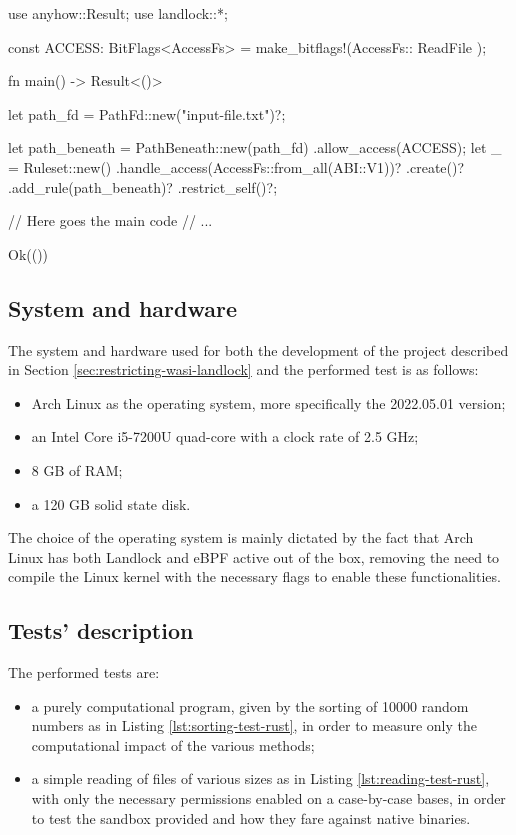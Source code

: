\vspace*{0.7cm}
\begin{code}[language=Rust, caption=An example of a program restricted with Landlock., label=lst:test-program-landlock-example]
use anyhow::Result;
use landlock::*;

const ACCESS: BitFlags<AccessFs> =
  make_bitflags!(AccessFs::{ ReadFile });

fn main() -> Result<()> {
    let path_fd = PathFd::new("input-file.txt")?;
    
    let path_beneath = PathBeneath::new(path_fd)
      .allow_access(ACCESS);
    let _ = Ruleset::new()
        .handle_access(AccessFs::from_all(ABI::V1))?
        .create()?
        .add_rule(path_beneath)?
        .restrict_self()?;

    // Here goes the main code
    // ...

    Ok(())
}
\end{code}

\clearpage
\subsection{System and hardware}

The system and hardware used for both the development of the project described in Section \ref{sec:restricting-wasi-landlock}
and the performed test is as follows:
\begin{itemize}
  \item Arch Linux \cite{arch-linux} as the operating system, more specifically the 2022.05.01 version;
  \item an Intel Core i5-7200U quad-core with a clock rate of 2.5 GHz;
  \item 8 GB of RAM;
  \item a 120 GB solid state disk.
\end{itemize}

The choice of the operating system is mainly dictated by the fact that Arch Linux has both Landlock and eBPF active
out of the box, removing the need to compile the Linux kernel with the necessary flags to enable these
functionalities.

\subsection{Tests' description}
\label{sec:performance-test-description}

The performed tests are:
\begin{itemize}
  \item a purely computational program, given by the sorting of 10000 random numbers as in Listing \ref{lst:sorting-test-rust},
        in order to measure only the computational impact of the various methods;
  \item a simple reading of files of various sizes as in Listing \ref{lst:reading-test-rust}, with only the necessary permissions enabled on
        a case-by-case bases, in order to test the sandbox provided and how they fare against native binaries.
\end{itemize}

